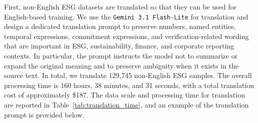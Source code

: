 \documentclass[11pt]{article}
\begin{document}
\begin{table}[t]
\centering
\small
{}
\caption{Contamination checks between \textsf{ESG-Instruct} and \textsf{ESGU-Bench}.}
\label{tab:contamination_check}
\end{table}
First, non-English ESG datasets are translated so that they can be used for English-based training. We use the \texttt{Gemini 3.1 Flash-Lite} for translation and design a dedicated translation prompt to preserve numbers, named entities, temporal expressions, commitment expressions, and verification-related wording that are important in ESG, sustainability, finance, and corporate reporting contexts. In particular, the prompt instructs the model not to summarize or expand the original meaning and to preserve ambiguity when it exists in the source text. In total, we translate 129,745 non-English ESG samples. The overall processing time is 160 hours, 38 minutes, and 31 seconds, with a total translation cost of approximately \$187. The data scale and processing time for translation are reported in Table~\ref{tab:translation_time}, and an example of the translation prompt is provided below.

\end{document}
